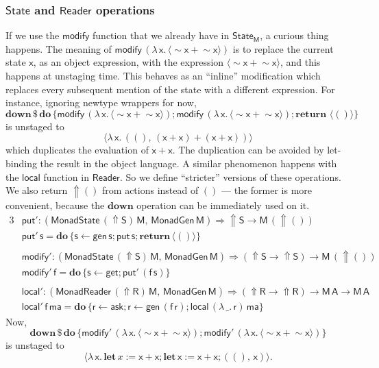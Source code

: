 \documentclass[acmsmall]{acmart}
\newcommand{\mit}[1]{{\mathsf{#1}}}
\newcommand{\msf}[1]{{\mathsf{#1}}}
\newcommand{\mbf}[1]{{\mathbf{#1}}}
\newcommand{\bs}[1]{\boldsymbol{#1}}
\newcommand{\mdo}{\mbf{do}\,}
\newcommand{\return}{\mbf{return}\,}
\newcommand{\lam}{\lambda\,}
\newcommand{\M}{\msf{M}}
\newcommand{\letdef}{\mbf{let\,}}
\newcommand{\vma}{\mathsf{ma}}
\newcommand{\vA}{\mathsf{A}}
\newcommand{\vS}{\mathsf{S}}
\newcommand{\vR}{\mathsf{R}}
\newcommand{\vM}{\mathsf{M}}
\newcommand{\vx}{\mathsf{x}}
\newcommand{\vf}{\mathsf{f}}
\newcommand{\vs}{\mathsf{s}}
\newcommand{\vr}{\mathsf{r}}
\newcommand{\Reader}{\msf{Reader}}
\newcommand{\fro}{\leftarrow}
\newcommand{\Up}{{\Uparrow}}
\newcommand{\spl}{{\bs{\sim}}}
\newcommand{\ql}{{\bs{\langle}}}
\newcommand{\qr}{{\bs{\rangle}}}
\theoremstyle{remark}
\newcommand{\mdown}{\mbf{down}}
\newcommand{\gen}{\mit{gen}}
\newcommand{\qt}[1]{\ql#1\qr}
\newcommand{\MonadGen}{\msf{MonadGen}}
\newcommand{\MonadState}{\msf{MonadState}}
\newcommand{\MonadReader}{\msf{MonadReader}}
\newcommand{\RA}{\Rightarrow}
\newcommand{\dlr}{\,\$\,}
\newcommand{\State}{\msf{State}}
\newcommand{\modify}{\mit{modify}}
\newcommand{\get}{\mit{get}}
\newcommand{\mput}{\mit{put}}
\begin{document}
\subsubsection{$\State$ and $\Reader$ operations} If we use
the $\modify$ function that we already have in $\State_\M$, a curious thing
happens. The meaning of $\modify\,(\lam \vx.\,\qt{\spl \vx + \spl \vx})$ is to
replace the current state $\vx$, as an object expression, with the expression
$\qt{\spl \vx + \spl \vx}$, and this happens at unstaging time. This behaves as an
``inline'' modification which replaces every subsequent mention of the state
with a different expression. For instance, ignoring newtype wrappers for now,
\[ \mdown \dlr \mdo \{\modify\,(\lam \vx.\,\qt{\spl \vx + \spl \vx}); \modify\,(\lam \vx.\,\qt{\spl \vx + \spl \vx});\return\,\qt{()}\} \]
is unstaged to
\[ \qt{\lam \vx.\,((),\,(\vx + \vx) + (\vx + \vx))} \]
which duplicates the evaluation of $\vx + \vx$. The duplication can be avoided
by let-binding the result in the object language. A similar phenomenon happens
with the $\mit{local}$ function in $\Reader$. So we define ``stricter'' versions
of these operations. We also return $\Up ()$ from actions instead of $()$ ---
the former is more convenient, because the $\mdown$ operation can be immediately
used on it.
\begingroup
\allowdisplaybreaks
\begin{alignat*}{3}
  & \mput' : (\MonadState\,(\Up \vS)\,\vM,\,\MonadGen\,\vM) \RA \Up \vS \to \vM\,(\Up ()) \\
  & \mput'\,\vs = \mdo \{\vs \fro \gen\,\vs; \mput\,\vs; \return \qt{()}\}\\
  &\\
  & \modify' : (\MonadState\,(\Up \vS)\,\vM,\,\MonadGen\,\vM) \RA (\Up \vS \to \Up \vS) \to \vM\,(\Up ()) \\
  & \modify'\,\vf = \mdo \{\vs \fro \get; \mput'\,(\vf\,\vs)\}\\
  &\\
  & \mit{local'} : (\MonadReader\,(\Up \vR)\,\vM,\,\MonadGen\,\vM) \RA (\Up \vR \to \Up \vR) \to \vM\,\vA \to \vM\,\vA\\
  & \mit{local'}\,\vf\,\vma = \mdo \{\vr \fro \mit{ask}; \vr \fro \gen\,(\vf\,\vr);\mit{local}\,(\lam \_.\,\vr)\,\vma\}
\end{alignat*}
\endgroup
Now,
\[ \mdown \dlr \mdo \{\modify'\,(\lam \vx.\,\qt{\spl \vx + \spl \vx}); \modify'\,(\lam \vx.\,\qt{\spl \vx + \spl \vx})\} \]
is unstaged to
\[ \qt{\lam \vx.\,\letdef x := \vx + \vx; \letdef \vx := \vx + \vx; ((),\,\vx)}. \]
\end{document}

